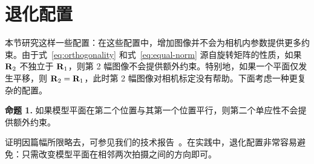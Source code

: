 \section{退化配置}\label{sec:degenerate-configurations}

本节研究这样一些配置：在这些配置中，增加图像并不会为相机内参数提供更多约束。由于式~\eqref{eq:orthogonality} 和式~\eqref{eq:equal-norm} 源自旋转矩阵的性质，如果 $\mathbf{R}_2$ 不独立于 $\mathbf{R}_1$，则第 2 幅图像不会提供额外约束。特别地，如果一个平面仅发生平移，则 $\mathbf{R}_2=\mathbf{R}_1$，此时第 2 幅图像对相机标定没有帮助。下面考虑一种更复杂的配置。

\noindent\textbf{命题 1.}
如果模型平面在第二个位置与其第一个位置平行，则第二个单应性不会提供额外约束。

证明因篇幅所限略去，可参见我们的技术报告~\cite{zhang1998flexible}。在实践中，退化配置非常容易避免：只需改变模型平面在相邻两次拍摄之间的方向即可。
